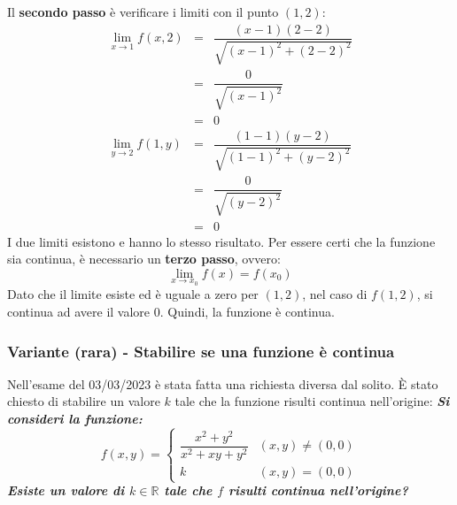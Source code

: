 \documentclass[a4paper]{article}
\begin{document}
	\noindent
	Il \textbf{secondo passo} è verificare i limiti con il punto $\left(1,2\right)$:
	\begin{equation*}
		\begin{array}{rcl}
			\displaystyle\lim_{x \rightarrow 1} f\left(x,2\right) &=& \dfrac{\left(x-1\right)\left(2-2\right)}{\sqrt{\left(x-1\right)^{2} + \left(2-2\right)^{2}}} \\ [2em]
			&=& \dfrac{0}{\sqrt{\left(x-1\right)^{2}}} \\ [2em]
			&=& 0 \\ [2em]
			\displaystyle\lim_{y \rightarrow 2} f\left(1,y\right) &=& \dfrac{\left(1-1\right)\left(y-2\right)}{\sqrt{\left(1-1\right)^{2} + \left(y-2\right)^{2}}} \\ [2em]
			&=& \dfrac{0}{\sqrt{\left(y-2\right)^{2}}} \\ [2em]
			&=& 0
		\end{array}
	\end{equation*}
	I due limiti esistono e hanno lo stesso risultato. Per essere certi che la funzione sia continua, è necessario un \textbf{terzo passo}, ovvero:
	\begin{equation*}
		\displaystyle\lim_{x \rightarrow x_{0}} f\left(x\right) = f\left(x_{0}\right)
	\end{equation*}
	Dato che il limite esiste ed è uguale a zero per $\left(1,2\right)$, nel caso di $f\left(1,2\right)$, si continua ad avere il valore $0$. Quindi, la funzione è continua.\newpage

	\subsubsection{Variante (rara) - Stabilire se una funzione è continua}

	Nell'esame del 03/03/2023 è stata fatta una richiesta diversa dal solito. È stato chiesto di stabilire un valore $k$ tale che la funzione risulti continua nell'origine: \textcolor{Green4}{\textbf{\emph{Si consideri la funzione:}}
	\begin{equation*}
		f\left(x,y\right) = \begin{cases}
			\dfrac{x^{2} + y^{2}}{x^{2} + xy + y^{2}}	& \left(x,y\right) \ne \left(0,0\right) \\
			k	& \left(x,y\right) = \left(0,0\right)
		\end{cases}
	\end{equation*}
	\textbf{\emph{Esiste un valore di $k \in \mathbb{R}$ tale che $f$ risulti continua nell'origine?}}}\newline
\end{document}
